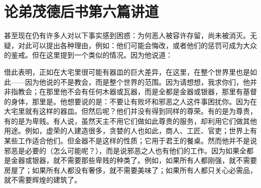 

\section{论弟茂德后书第六篇讲道}

\par

\par

甚至现在仍有许多人对以下事实感到困惑：为何恶人被容许存留，尚未被消灭。无疑，对此可以提出各种理由，例如：他们可能会悔改，或者他们的惩罚可成为大众的鉴戒。但在这里提到一个类似的情况。因为他说道：\par

借此表明，正如在大宅里很可能有器皿的巨大差异，在这里，在整个世界里也是如此——因为他说的不是教会，而是整个世界的范围。因为请想想，我求你们，他并非指教会；在那里他不会有任何木器或瓦器，而是全都是金器或银器，那里有基督的身体，那里是。他想要说的是：不要让有败坏和邪恶之人这件事困扰你。因为在大宅里就有这样的器皿。但然后呢？他们并没有得到同样的尊荣。有的是为尊贵，有的是为卑贱。有人说，虽然天主不用它们做如此尊贵的服务，却利用它们做其他用途。例如，虚荣的人建造很多，贪婪的人也如此，商人、工匠、官吏；世界上有某些工作适合他们。但金器不是这样的性质；它用于君王的餐桌。然而他并不是说邪恶是必要的（怎么可能呢？），而是说邪恶之人也有他们的工作。因为如果全都是金器或银器，就不需要那些卑贱的种类了。例如，如果所有人都刚强，就不需要房屋了；如果所有人都没有奢侈，就不需要美味了；如果所有人都只关心必需品，就不需要辉煌的建筑了。\par

